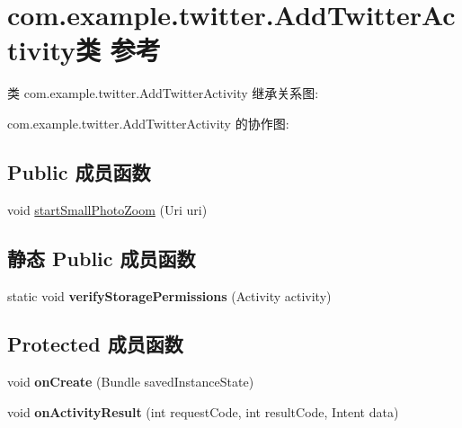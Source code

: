 \hypertarget{classcom_1_1example_1_1twitter_1_1_add_twitter_activity}{}\section{com.\+example.\+twitter.\+Add\+Twitter\+Activity类 参考}
\label{classcom_1_1example_1_1twitter_1_1_add_twitter_activity}


类 com.\+example.\+twitter.\+Add\+Twitter\+Activity 继承关系图\+:


com.\+example.\+twitter.\+Add\+Twitter\+Activity 的协作图\+:
\subsection*{Public 成员函数}
\begin{DoxyCompactItemize}
\item 
void \mbox{\hyperlink{classcom_1_1example_1_1twitter_1_1_add_twitter_activity_a374b108c7a9984fc3a6f77ff78437c40}{start\+Small\+Photo\+Zoom}} (Uri uri)
\end{DoxyCompactItemize}
\subsection*{静态 Public 成员函数}
\begin{DoxyCompactItemize}
\item 
\mbox{\label{classcom_1_1example_1_1twitter_1_1_add_twitter_activity_aac4d20ca96979f47bd17dbd31d55ed40}} 
static void {\bfseries verify\+Storage\+Permissions} (Activity activity)
\end{DoxyCompactItemize}
\subsection*{Protected 成员函数}
\begin{DoxyCompactItemize}
\item 
\mbox{\label{classcom_1_1example_1_1twitter_1_1_add_twitter_activity_acc444035001459f73eb8ef94caae0213}} 
void {\bfseries on\+Create} (Bundle saved\+Instance\+State)
\item 
\mbox{\label{classcom_1_1example_1_1twitter_1_1_add_twitter_activity_a7a74dfa200d6c1c516b201a5c1fa533a}} 
void {\bfseries on\+Activity\+Result} (int request\+Code, int result\+Code, Intent data)
\end{DoxyCompactItemize}


